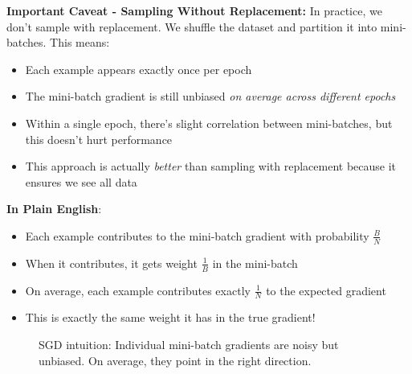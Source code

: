 \documentclass[11pt]{article}
\newcommand{\w}{\mathbf{w}}
\begin{document}
\textbf{Important Caveat - Sampling Without Replacement:}
In practice, we don't sample with replacement. We shuffle the dataset and partition it into mini-batches. This means:
\begin{itemize}
\item Each example appears exactly once per epoch
\item The mini-batch gradient is still unbiased \textit{on average across different epochs}
\item Within a single epoch, there's slight correlation between mini-batches, but this doesn't hurt performance
\item This approach is actually \textit{better} than sampling with replacement because it ensures we see all data
\end{itemize}

\textbf{In Plain English}: 
\begin{itemize}
\item Each example contributes to the mini-batch gradient with probability $\frac{B}{N}$
\item When it contributes, it gets weight $\frac{1}{B}$ in the mini-batch
\item On average, each example contributes exactly $\frac{1}{N}$ to the expected gradient
\item This is exactly the same weight it has in the true gradient!
\end{itemize}

\begin{figure}[h!]
\centering
{}
\caption{SGD intuition: Individual mini-batch gradients are noisy but unbiased. On average, they point in the right direction.}
\label{fig:sgd_intuition}
\end{figure}
\end{document}
